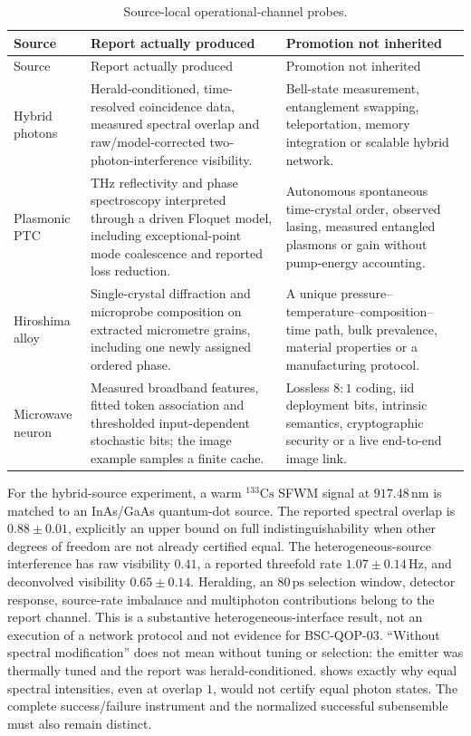 \documentclass[11pt,a4paper]{article}
\theoremstyle{definition}
\theoremstyle{plain}
\theoremstyle{remark}
\begin{document}
\begingroup
\small
\begin{longtable}{L{0.16\textwidth}L{0.38\textwidth}L{0.36\textwidth}}
\caption{Source-local operational-channel probes.}
\label{tab:channel-probes}\\
\toprule
Source & Report actually produced & Promotion not inherited\\
\midrule
\endfirsthead
\toprule
Source & Report actually produced & Promotion not inherited\\
\midrule
\endhead
Hybrid photons \citep{kim2026hybrid} &
Herald-conditioned, time-resolved coincidence data, measured spectral
overlap and raw/model-corrected two-photon-interference visibility. &
Bell-state measurement, entanglement swapping, teleportation, memory
integration or scalable hybrid network.\\
Plasmonic PTC \citep{guo2026ptc} &
THz reflectivity and phase spectroscopy interpreted through a driven Floquet
model, including exceptional-point mode coalescence and reported loss
reduction. &
Autonomous spontaneous time-crystal order, observed lasing, measured
entangled plasmons or gain without pump-energy accounting.\\
Hiroshima alloy \citep{bindi2026alloy} &
Single-crystal diffraction and microprobe composition on extracted
micrometre grains, including one newly assigned ordered phase. &
A unique pressure--temperature--composition--time path, bulk prevalence,
material properties or a manufacturing protocol.\\
Microwave neuron \citep{govind2026microwave} &
Measured broadband features, fitted token association and thresholded
input-dependent stochastic bits; the image example samples a finite cache. &
Lossless \(8{:}1\) coding, iid deployment bits, intrinsic semantics,
cryptographic security or a live end-to-end image link.\\
\bottomrule
\end{longtable}
\endgroup

For the hybrid-source experiment, a warm \(^{133}\mathrm{Cs}\) SFWM signal at
\(917.48\,\mathrm{nm}\) is matched to an InAs/GaAs quantum-dot source.  The
reported spectral overlap is \(0.88\pm0.01\), explicitly an upper bound on
full indistinguishability when other degrees of freedom are not already
certified equal.  The heterogeneous-source interference has raw visibility
\(0.41\), a reported threefold rate \(1.07\pm0.14\,\mathrm{Hz}\), and
deconvolved visibility \(0.65\pm0.14\).  Heralding, an \(80\,\mathrm{ps}\)
selection window, detector response, source-rate imbalance and multiphoton
contributions belong to the report channel.  This is a substantive
heterogeneous-interface result, not an execution of a network protocol and
not evidence for BSC-QOP-03.  ``Without spectral modification'' does not mean
without tuning or selection: the emitter was thermally tuned and the report
was herald-conditioned.   shows exactly why equal
spectral intensities, even at overlap \(1\), would not certify equal photon
states.  The complete success/failure instrument and the normalized
successful subensemble must also remain distinct.
\end{document}

